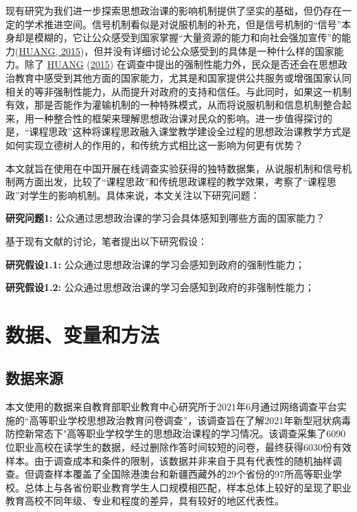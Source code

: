\documentclass[
  12pt,
]{ctexart}
\begin{document}
现有研究为我们进一步探索思想政治课的影响机制提供了坚实的基础，但仍存在一定的学术推进空间。信号机制看似是对说服机制的补充，但是信号机制的``信号''本身却是模糊的，它让公众感受到国家掌握``大量资源的能力和向社会强加宣传''的能力(\protect\hyperlink{ref-Huang2015a}{HUANG, 2015})，但并没有详细讨论公众感受到的具体是一种什么样的国家能力。除了 \protect\hyperlink{ref-Huang2015a}{HUANG} (\protect\hyperlink{ref-Huang2015a}{2015}) 在调查中提出的强制性能力外，民众是否还会在思想政治教育中感受到其他方面的国家能力，尤其是和国家提供公共服务或增强国家认同相关的等非强制性能力，从而提升对政府的支持和信任。与此同时，如果这一机制有效，那是否能作为灌输机制的一种特殊模式，从而将说服机制和信息机制整合起来，用一种整合性的框架来理解思想政治课对民众的影响。进一步值得探讨的是，``课程思政''这种将课程思政融入课堂教学建设全过程的思想政治课教学方式是如何实现立德树人的作用的，和传统方式相比这一影响为何更有优势？

本文就旨在使用在中国开展在线调查实验获得的独特数据集，从说服机制和信号机制两方面出发，比较了``课程思政''和传统思政课程的教学效果，考察了``课程思政''对学生的影响机制。具体来说，本文关注以下研究问题：

\textbf{研究问题1:} 公众通过思想政治课的学习会具体感知到哪些方面的国家能力？

基于现有文献的讨论，笔者提出以下研究假设：

\textbf{研究假设1.1:} 公众通过思想政治课的学习会感知到政府的强制性能力；

\textbf{研究假设1.2:} 公众通过思想政治课的学习会感知到政府的非强制性能力；

\hypertarget{ux6570ux636eux53d8ux91cfux548cux65b9ux6cd5}{%
\section{数据、变量和方法}\label{ux6570ux636eux53d8ux91cfux548cux65b9ux6cd5}}

\hypertarget{ux6570ux636eux6765ux6e90}{%
\subsection{数据来源}\label{ux6570ux636eux6765ux6e90}}

本文使用的数据来自教育部职业教育中心研究所于2021年6月通过网络调查平台实施的``高等职业学校思想政治教育问卷调查''，该调查旨在了解2021年新型冠状病毒防控新常态下"高等职业学校学生的思想政治课程的学习情况。该调查采集了6090位职业高校在读学生的数据，经过删除作答时间较短的问卷，最终获得6030份有效样本。由于调查成本和条件的限制，该数据并非来自于具有代表性的随机抽样调查。但调查样本覆盖了全国除港澳台和新疆西藏外的29个省份的97所高等职业学校。总体上与各省份职业教育学生人口规模相匹配，样本总体上较好的呈现了职业教育高校不同年级、专业和程度的差异，具有较好的地区代表性。
\end{document}
